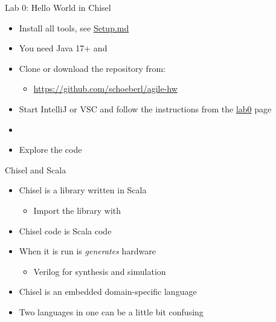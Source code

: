 \begin{frame}[fragile]{Lab 0: Hello World in Chisel}
\begin{itemize}
\item Install all tools, see \href{https://github.com/schoeberl/agile-hw/blob/main/Setup.md}{Setup.md}
\item You need Java 17+ and 
\item Clone or download the repository from:
\begin{itemize}
\item \url{https://github.com/schoeberl/agile-hw}
\end{itemize}
\item Start IntelliJ or VSC and follow the instructions from the \href{https://github.com/schoeberl/agile-hw/tree/main/lab0}{lab0} page 
\item {}
\item Explore the code
\end{itemize}
\end{frame}


\begin{frame}[fragile]{Chisel and Scala}
\begin{itemize}
\item Chisel is a library written in Scala
\begin{itemize}
\item Import the library with 
\end{itemize}
\item Chisel code is Scala code
\item When it is run is \emph{generates} hardware
\begin{itemize}
\item Verilog for synthesis and simulation
\end{itemize}
\item Chisel is an embedded domain-specific language
\item Two languages in one can be a little bit confusing
\end{itemize}
\end{frame}


